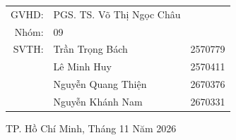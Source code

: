 \documentclass[12pt, a4paper]{report}
\theoremstyle{definition}
\DeclareRobustCommand{\_}{\textunderscore\allowbreak}
\begin{document}
\begin{titlepage}
\begin{tikzpicture}
\end{tikzpicture}

\vspace{.85cm}%

\begin{table}[h!]
    \centering
    \renewcommand{\arraystretch}{1.2}
    \begin{tabular}{rll}
        GVHD:         & PGS. TS. Võ Thị Ngọc Châu &         \\
        Nhóm:         & 09                        &         \\
        SVTH: & Trần Trọng Bách           & 2570779 \\
                      & Lê Minh Huy               & 2570411 \\
                      & Nguyễn Quang Thiện        & 2670376 \\
                      & Nguyễn Khánh Nam          & 2670331
    \end{tabular}
\end{table}

\begin{center}
    \vspace{2cm}
    {TP. Hồ Chí Minh, Tháng 11 Năm 2026}
\end{center}
\thispagestyle{empty}
\end{titlepage}
\end{document}

